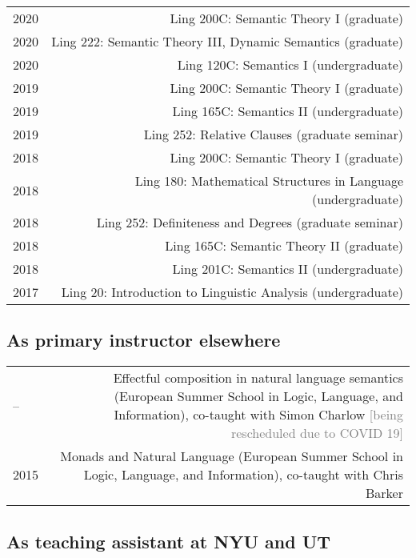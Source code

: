 \documentclass[12pt]{article}
\begin{document}
\begin{longtable}{LR}
  2020 & Ling 200C: Semantic Theory I (graduate)\\
  2020 & Ling 222: Semantic Theory III, Dynamic Semantics (graduate)\\
  2020 & Ling 120C: Semantics I (undergraduate)\\
  2019 & Ling 200C: Semantic Theory I (graduate)\\
  2019 & Ling 165C: Semantics II (undergraduate)\\
  2019 & Ling 252: Relative Clauses (graduate seminar)\\
  2018 & Ling 200C: Semantic Theory I (graduate)\\
  2018 & Ling 180: Mathematical Structures in Language (undergraduate)\\
  2018 & Ling 252: Definiteness and Degrees (graduate seminar)\\
  2018 & Ling 165C: Semantic Theory II (graduate)\\
  2018 & Ling 201C: Semantics II (undergraduate)\\
  2017 & Ling 20: Introduction to Linguistic Analysis (undergraduate)
\end{longtable}

\subsection*{As primary instructor elsewhere}%

\begin{longtable}{LR}
  --   & Effectful composition in natural language semantics (European Summer
         School in Logic, Language, and Information), co-taught with Simon
         Charlow\newline
         \textcolor{gray}{[being rescheduled due to COVID 19]}\\
  2015 & Monads and Natural Language (European Summer School in Logic, Language,
         and Information), co-taught with Chris Barker
\end{longtable}

\subsection*{As teaching assistant at NYU and UT}
\end{document}
